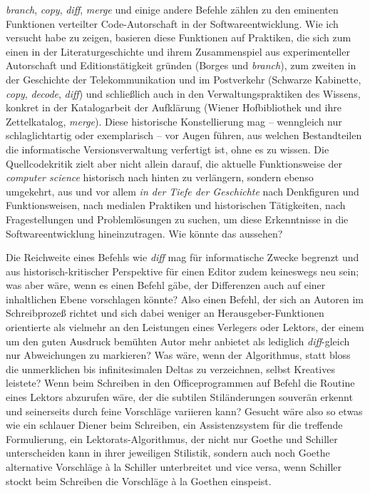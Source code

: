 \documentclass[a4paper,11pt]{article}
\begin{document}
\emph{branch}, \emph{copy}, \emph{diff}, \emph{merge} und einige andere Befehle zählen zu den eminenten Funktionen verteilter Code-Autorschaft in der Softwareentwicklung. Wie ich versucht habe zu zeigen, basieren diese Funktionen auf Praktiken, die sich zum einen in der Literaturgeschichte und ihrem Zusammenspiel aus experimenteller Autorschaft und Editionstätigkeit gründen (Borges und \emph{branch}), zum zweiten in der Geschichte der Telekommunikation und im Postverkehr (Schwarze Kabinette, \emph{copy}, \emph{decode}, \emph{diff}) und schließlich auch in den Verwaltungspraktiken des Wissens, konkret in der Katalogarbeit der Aufklärung (Wiener Hofbibliothek und ihre Zettelkatalog, \emph{merge}). Diese historische Konstellierung mag – wenngleich nur schlaglichtartig oder exemplarisch – vor Augen führen, aus welchen Bestandteilen die informatische Versionsverwaltung verfertigt ist, ohne es zu wissen. Die Quellcodekritik zielt aber nicht allein darauf, die aktuelle Funktionsweise der \emph{computer science} historisch nach hinten zu verlängern, sondern ebenso umgekehrt, aus und vor allem \emph{in der Tiefe der Geschichte} nach Denkfiguren und Funktionsweisen, nach medialen Praktiken und historischen Tätigkeiten, nach Fragestellungen und Problemlösungen zu suchen, um diese Erkenntnisse in die Softwareentwicklung hineinzutragen. Wie könnte das aussehen? 

Die Reichweite eines Befehls wie \emph{diff} mag für informatische Zwecke begrenzt und aus historisch-kritischer Perspektive für einen Editor zudem keineswegs neu sein; was aber wäre, wenn es einen Befehl gäbe, der Differenzen auch auf einer inhaltlichen Ebene vorschlagen könnte? Also einen Befehl, der sich an Autoren im Schreibprozeß richtet und sich dabei weniger an Herausgeber-Funktionen orientierte als vielmehr an den Leistungen eines Verlegers oder Lektors, der einem um den guten Ausdruck bemühten Autor mehr anbietet als lediglich \emph{diff}-gleich nur Abweichungen zu markieren? Was wäre, wenn der Algorithmus, statt bloss die unmerklichen bis infinitesimalen Deltas zu verzeichnen, selbst Kreatives leistete? Wenn beim Schreiben in den Officeprogrammen auf Befehl die Routine eines Lektors abzurufen wäre, der die subtilen Stiländerungen souverän erkennt und seinerseits durch feine Vorschläge variieren kann? Gesucht wäre also so etwas wie ein schlauer Diener beim Schreiben, ein Assistenzsystem für die treffende Formulierung, ein Lektorats-Algorithmus, der nicht nur Goethe und Schiller unterscheiden kann in ihrer jeweiligen Stilistik, sondern auch noch Goethe alternative Vorschläge à la Schiller unterbreitet und vice versa, wenn Schiller stockt beim Schreiben die Vorschläge à la Goethen einspeist.
\end{document}
